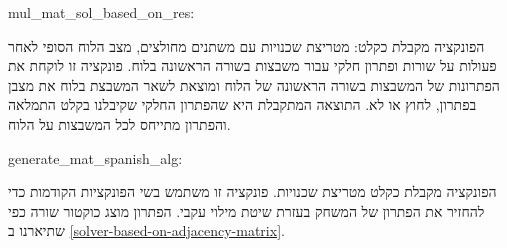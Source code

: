 \begin{english}
    mul\_mat\_sol\_based\_on\_res:
\end{english}

הפונקציה מקבלת כקלט: מטריצת שכנויות עם משתנים מחולצים,
מצב הלוח הסופי לאחר פעולות על שורות ופתרון חלקי עבור משבצות בשורה הראשונה בלוח.
פונקציה זו לוקחת את הפתרונות של המשבצות בשורה הראשונה
של הלוח 
ומוצאת לשאר המשבצת בלוח את מצבן בפתרון,
לחוץ או לא.
התוצאה המתקבלת היא שהפתרון החלקי שקיבלנו בקלט התמלאה
והפתרון מתייחס לכל המשבצות על הלוח.

\begin{english}
    generate\_mat\_spanish\_alg:
\end{english}

הפונקציה מקבלת כקלט מטריצת שכנויות.
פונקציה זו משתמש בשי הפונקציות הקודמות
כדי להחזיר את הפתרון של המשחק בעזרת שיטת מילוי עקבי.
הפתרון מוצג כוקטור שורה כפי שתיארנו ב
\ref{solver-based-on-adjacency-matrix}.
